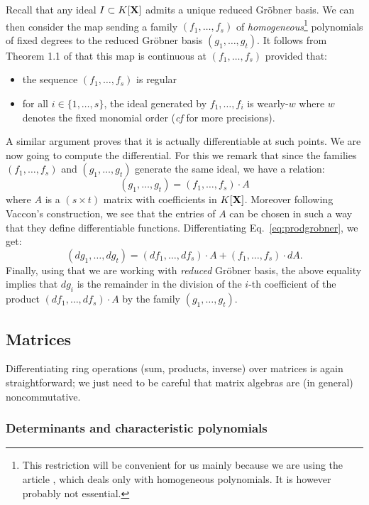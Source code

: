 \documentclass{lms}
\begin{document}
Recall that any 
ideal $I \subset K[\mathbf X]$ admits a unique reduced Gr\"obner basis. We can 
then consider the map sending a family $(f_1, \ldots, f_s)$ of 
\emph{homogeneous}\footnote{This restriction will be convenient for us 
mainly because we are using the article \cite{Vaccon}, which deals only 
with homogeneous polynomials. It is however probably not essential.} 
polynomials of fixed degrees to the reduced Gr\"obner basis $(g_1, 
\ldots, g_t)$. It follows from Theorem 1.1 of \cite{Vaccon} that this 
map is continuous at $(f_1, \ldots, f_s)$ provided that:
\begin{itemize}
\item the sequence $(f_1, \ldots, f_s)$ is regular
\item for all $i \in \{1, \ldots, s\}$, the ideal generated by
$f_1, \ldots, f_i$ is wearly-$w$ where $w$ denotes the fixed monomial
order (\emph{cf} \cite{Vaccon} for more precisions).
\end{itemize}
A similar argument proves that it is actually differentiable at such
points. We are now going to compute the differential. For this we
remark that since the families $(f_1, \ldots, f_s)$ and $(g_1, \ldots,
g_t)$ generate the same ideal, we have a relation:
\begin{equation}
\label{eq:prodgrobner}
(g_1, \ldots, g_t) = (f_1, \ldots, f_s) \cdot A
\end{equation}
where $A$ is a $(s \times t)$ matrix with coefficients in $K[\mathbf X]$.
Moreover following Vaccon's construction, we see that the entries of $A$ 
can be chosen in such a way that they define differentiable functions.
Differentiating Eq.~\eqref{eq:prodgrobner}, we get:
$$(d g_1, \ldots, d g_t) =
(d f_1, \ldots, d f_s) \cdot A + (f_1, \ldots, f_s) \cdot dA.$$
Finally, using that we are working with \emph{reduced} Gr\"obner
basis, the above equality implies that $d g_i$ is the remainder in
the division of the $i$-th coefficient of the product
$(d f_1, \ldots, d f_s) \cdot A$ by the family $(g_1, \ldots, g_t)$.

\subsection{Matrices}

Differentiating ring operations (sum, products, inverse) over matrices 
is again straightforward; we just need to be careful that matrix 
algebras are (in general) noncommutative.

\subsubsection*{Determinants and characteristic polynomials}
\end{document}
